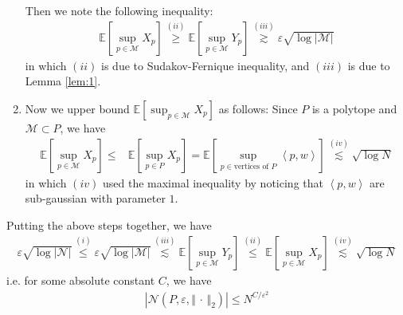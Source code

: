 \documentclass[11pt,a4paper]{article}
\numberwithin{equation}{section}%
\begin{document}
\begin{enumerate}[topsep=2pt,itemsep=2pt]
    Then we note the following inequality:
    \begin{align*}
        \mathbb{E}\left[ \sup_{p\in\mathcal{M}}X_p \right] \mathop{ \geq  }\limits^{(ii)}  \mathbb{E}\left[ \sup_{p\in\mathcal{M}}Y_p \right] \mathop{ \gtrsim }\limits^{(iii)} \varepsilon \sqrt{\log \left\vert \mathcal{M} \right\vert } 
    \end{align*}
    in which $ (ii) $ is due to Sudakov-Fernique inequality, and $ (iii) $ is due to Lemma \ref{lem:1}.
    \item Now we upper bound $ \mathbb{E}\left[ \sup_{p\in\mathcal{M}}X_p \right] $ as follows: Since $ P $ is a polytope and $ \mathcal{M}\subset P $, we have
    \begin{align*}
        \mathbb{E}\left[ \sup_{p\in\mathcal{M}}X_p \right] \leq &\mathbb{E}\left[ \sup_{p\in P}X_p \right] = \mathbb{E}\left[ \sup_{p\in \text{vertices of }P}\left\langle p,w \right\rangle  \right] \mathop{ \lesssim }\limits^{(iv)}  \sqrt{\log N}
    \end{align*}
    in which $ (iv) $ used the maximal inequality by noticing that $ \left\langle p,w \right\rangle  $ are sub-gaussian with parameter $ 1 $.
\end{enumerate}

Putting the above steps together, we have
\begin{align*}
    \varepsilon \sqrt{\log \left\vert \mathcal{N} \right\vert }  \mathop{ \leq }\limits^{(i)}  \varepsilon \sqrt{\log \left\vert \mathcal{M} \right\vert } \mathop{ \lesssim }\limits^{(iii)} \mathbb{E}\left[ \sup_{p\in\mathcal{M}}Y_p \right]  \mathop{ \leq  }\limits^{(ii)} \mathbb{E}\left[ \sup_{p\in\mathcal{M}}X_p \right] \mathop{ \lesssim }\limits^{(iv)} \sqrt{\log N}
\end{align*}
i.e. for some absolute constant $ C $, we have
\begin{align*}
    \left\vert \mathcal{N}(P,\varepsilon ,\left\Vert \, \cdot \,  \right\Vert _2) \right\vert \leq N^{C/\varepsilon ^2}
\end{align*}





    
\end{document}
